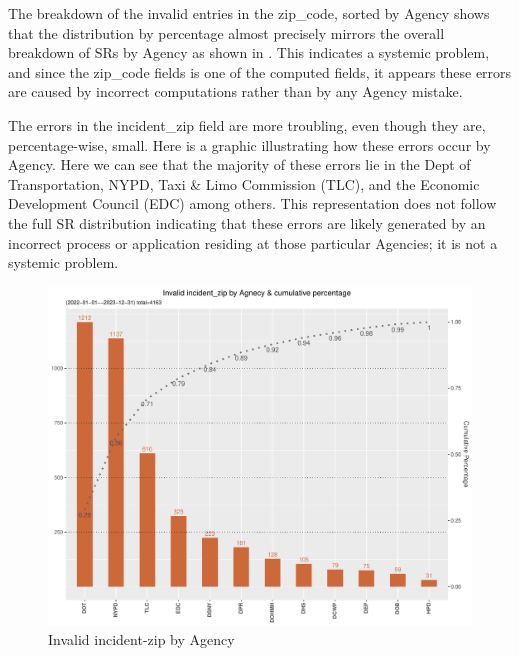 \documentclass[12pt, titlepage]{article}
\begin{document}
	The breakdown of the invalid entries in the zip\_code, sorted by Agency shows that the distribution by percentage
	almost precisely mirrors the overall breakdown of SRs by Agency as shown in . This indicates a systemic problem, and since the
	zip\_code fields is one of the computed fields, it appears these errors are caused by incorrect computations rather
	than by any Agency mistake.
	
	The  errors in the incident\_zip field are more troubling, even though they are, percentage-wise, small. Here is a graphic 
	illustrating how these errors occur by Agency. Here we can see that the majority of these errors lie in the Dept of Transportation,
	NYPD, Taxi \& Limo Commission (TLC), and the Economic Development Council (EDC) among others. This representation
	does not follow the full SR distribution indicating that these errors are likely generated by an incorrect
	process or application residing at those particular Agencies; it is not a systemic problem.

	\begin{figure}[H]
	  \centering
		  \includegraphics[width=\textwidth]{invalid_incident_zip.pdf}
		  \caption{Invalid incident-zip by Agency}
		  \label{fig:invalid_incident_zip}
	\end{figure}
	
\end{document}
